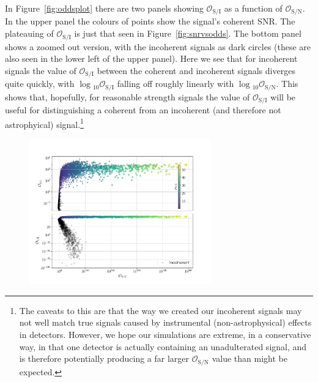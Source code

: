 In Figure~\ref{fig:oddsplot} there are two panels showing $\mathcal{O}_{\text{S}/\text{I}}$ as a function of $\mathcal{O}_{\text{S}/\text{N}}$. In the upper
panel the colours of points show the signal's coherent SNR. The plateauing of $\mathcal{O}_{\text{S}/\text{I}}$ is just that seen in Figure~\ref{fig:snrvsodds}. The
bottom panel shows a zoomed out version, with the incoherent signals as dark circles (these are also seen in the lower left of the upper panel). Here we see that for incoherent signals
the value of $\mathcal{O}_{\text{S}/\text{I}}$ between the coherent and incoherent signals diverges quite quickly, with $\log{}_{10}{\mathcal{O}_{\text{S}/\text{I}}}$
falling off roughly linearly with $\log{}_{10}{\mathcal{O}_{\text{S}/\text{N}}}$. This shows that, hopefully, for reasonable strength signals the value of
$\mathcal{O}_{\text{S}/\text{I}}$ will be useful for distinguishing a coherent from an incoherent (and therefore not astrophyical) signal.\footnote{The caveats
to this are that the way we created our incoherent signals may not well match true signals caused by instrumental (non-astrophysical) effects in \gw detectors.
However, we hope our simulations are extreme, in a conservative way, in that one detector is actually containing an unadulterated signal, and is therefore
potentially producing a far larger $\mathcal{O}_{\text{S}/\text{N}}$ value than might be expected.}

\begin{figure}[phtb]
\begin{center}
\includegraphics[width=0.7\textwidth]{./figures/codeeval/stats/odds/odds_plot}
\caption{ \protect}
\end{center}
\end{figure}


